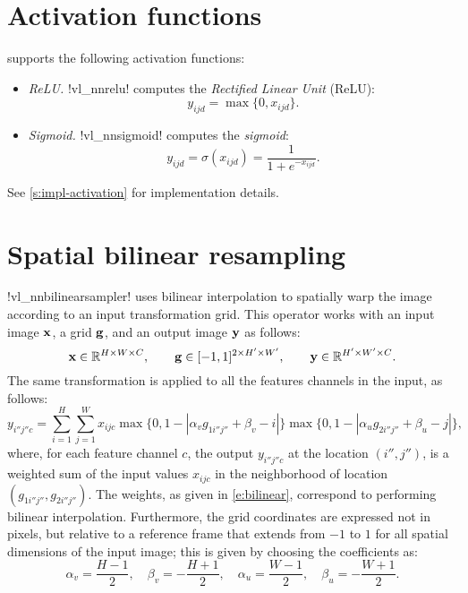 \section{Activation functions}\label{s:activation}

\matconvnet supports the following activation functions:
%
\begin{itemize}
\item \emph{ReLU.} !vl_nnrelu! computes the \emph{Rectified Linear Unit} (ReLU):
\[
 y_{ijd} = \max\{0, x_{ijd}\}.
\]

\item \emph{Sigmoid.} !vl_nnsigmoid! computes the \emph{sigmoid}:
\[
 y_{ijd} = \sigma(x_{ijd}) = \frac{1}{1+e^{-x_{ijd}}}.
\]
\end{itemize}
%
See \cref{s:impl-activation} for implementation details.

\section{Spatial bilinear resampling}\label{s:spatial-sampler}

!vl_nnbilinearsampler! uses bilinear interpolation to spatially warp the image according to an input transformation grid. This operator works with an input image $\mathbf{x}$, a grid $\mathbf{g}$, and an output image $\mathbf{y}$ as follows:
\[
  \mathbf{x} \in \mathbb{R}^{H \times W \times C},
  \qquad
  \mathbf{g} \in [-1,1]^{2 \times H' \times W'},
  \qquad
  \mathbf{y} \in \mathbb{R}^{H' \times W' \times C}.
\]
The same transformation is applied to all the features channels in the input, as follows:
\begin{equation}\label{e:bilinear}
  y_{i''j''c}
  =
  \sum_{i=1}^H
  \sum_{j=1}^W
  x_{ijc}
  \max\{0, 1-|\alpha_v g_{1i''j''} + \beta_v - i|\}
  \max\{0, 1-|\alpha_u g_{2i''j''} + \beta_u - j|\},
\end{equation}
where, for each feature channel $c$, the output $y_{i''j''c}$ at the location $(i'',j'')$, is a weighted sum of the input values $x_{ijc}$ in the neighborhood of location $(g_{1i''j''},g_{2i''j''})$. The weights, as given in \eqref{e:bilinear}, correspond to performing bilinear interpolation. Furthermore, the grid coordinates are expressed not in pixels, but relative to a reference frame that extends from $-1$ to $1$ for all spatial dimensions of the input image; this is given by choosing the coefficients as:
\[
\alpha_v = \frac{H-1}{2},\quad
\beta_v = -\frac{H+1}{2},\quad
\alpha_u = \frac{W-1}{2},\quad
\beta_u = -\frac{W+1}{2}.
\]


